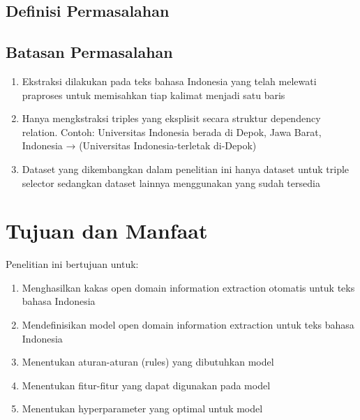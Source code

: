 \subsection{Definisi Permasalahan}


\subsection{Batasan Permasalahan}

\begin{enumerate}
\item Ekstraksi dilakukan pada teks bahasa Indonesia yang telah melewati praproses untuk memisahkan tiap kalimat menjadi satu baris
\item Hanya mengkstraksi triples yang eksplisit secara struktur dependency relation. Contoh: Universitas Indonesia berada di Depok, Jawa Barat, Indonesia → (Universitas Indonesia-terletak di-Depok)
\item Dataset yang dikembangkan dalam penelitian ini hanya dataset untuk triple selector sedangkan dataset lainnya menggunakan yang sudah tersedia
\end{enumerate}

\section{Tujuan dan Manfaat}

Penelitian ini bertujuan untuk:
\begin{enumerate}
\item Menghasilkan kakas open domain information extraction otomatis untuk teks bahasa Indonesia
\item Mendefinisikan model open domain information extraction untuk teks bahasa Indonesia
\item Menentukan aturan-aturan (rules) yang dibutuhkan model
\item Menentukan fitur-fitur yang dapat digunakan pada model
\item Menentukan hyperparameter yang optimal untuk model
\end{enumerate}

